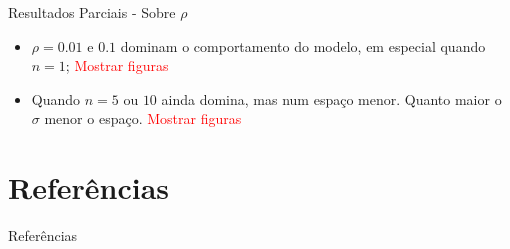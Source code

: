 \documentclass{beamer}
\begin{document}
\begin{frame}{Resultados Parciais - Sobre \(\rho\)}
  \begin{itemize}
  \item \(\rho = 0.01 \) e \(0.1 \) dominam o comportamento do modelo, em especial
    quando \(n = 1\); \textcolor{red}{Mostrar figuras}
  \item Quando \(n = 5 \text{ ou } 10\) ainda domina, mas num espaço menor.
    Quanto maior o \(\sigma\) menor o espaço. \textcolor{red}{Mostrar figuras}
  \end{itemize}
  
\end{frame}

\section*{Referências}
\begin{frame}[allowframebreaks]{Referências}
\printbibliography[heading=none]
\end{frame}
\end{document}
